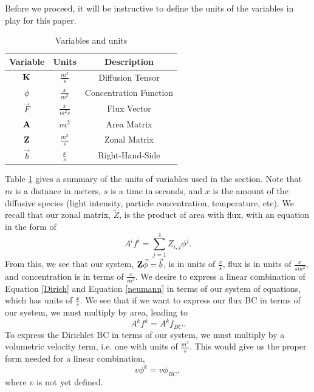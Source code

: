 \documentclass[11pt,letterpaper,oneside,notitlepage]{article}	%
\newcommand{\tensor}{\overleftrightarrow}		%
\newcommand{\eq}[1]{Equation \eqref{#1}}		%
\numberwithin{equation}{section}				%
\begin{document}
Before we proceed, it will be instructive to define the units of the variables in play for this paper.
\begin{table}[h]	%
\begin{centering}	%
\begin{tabular}{| c | c | c |}	%
\hline	%
Variable & Units & Description \\
  \hline\hline
  $\bf K$ & $\frac{m^2}{s}$ & Diffusion Tensor \\	\hline 
  $\phi$ & $\frac{x}{m^3}$ & Concentration Function \\	\hline
  $\vec F$ & $\frac{x}{m^2 s}$ & Flux Vector \\	\hline
  $\bf A$  & $m^2$ & Area Matrix \\	\hline
  $\bf Z$  & $\frac{m^3}{s}$ & Zonal Matrix \\	\hline
  $\vec b$  &  $\frac{x}{s}$ & Right-Hand-Side \\
  \hline  
\end{tabular}
\caption{Variables and units}\label{Units}	%
\end{centering}
\end{table}
Table \ref{Units} gives a summary of the units of variables used in the section. Note that $m$ is a distance in meters, $s$ is a time in seconds, and $x$ is the amount of the diffusive species (light intensity, particle concentration, temperature, etc). We recall that our zonal matrix, $\tensor Z$, is the product of area with flux, with an equation in the form of 
\begin{equation}
A^i f^i = \sum_{j=1}^4 Z_{i,j} \phi^j \label{FluxSystem}
.\end{equation}
From this, we see that our system, ${\bf Z}\vec\phi=\vec b$, is in units of $\frac{x}{s}$, flux is in units of $\frac{x}{sm^2}$, and concentration is in terms of $\frac{x}{m^3}$. We desire to express a linear combination of \eq{Dirich} and \eq{neumann} in terms of our system of equations, which has units of $\frac{x}{s}$. We see that if we want to express our flux BC in terms of our system, we must multiply by area, leading to 
\begin{equation}
A^k f^k = A^k f_{BC} \label{N}
.\end{equation}
To express the Dirichlet BC in terms of our system, we must multiply by a volumetric velocity term, i.e. one with units of $\frac{m^3}{s}$. This would give us the proper form needed for a linear combination,
\begin{equation}
v\phi^k = v\phi_{BC} \label{D},
\end{equation}
where $v$ is not yet defined.
\end{document}
